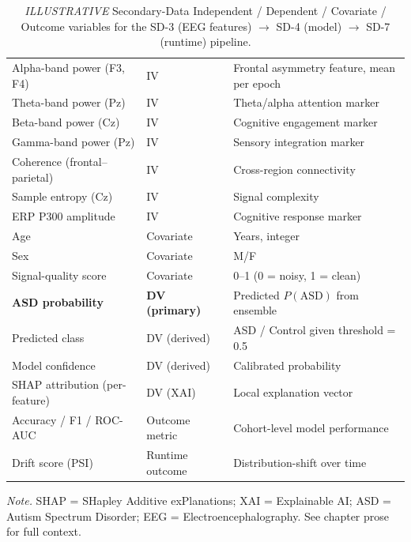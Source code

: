 {\tablestripes\tablefontsize
{}
\begin{xltabular}{\textwidth}{@{} >{\raggedright\arraybackslash}p{3.5cm} >{\centering\arraybackslash}p{1.8cm} L @{}}
\caption[ILLUSTRATIVE Secondary-Data IV/DV Map]{\emph{ILLUSTRATIVE} Secondary-Data Independent / Dependent / Covariate / Outcome variables for the SD-3 (EEG features) $\to$ SD-4 (model) $\to$ SD-7 (runtime) pipeline.}\label{tab:ch4_secondary_iv_dv} \\
\toprule
{} &  &  \\
\midrule
\endfirsthead
\endhead
\bottomrule
\endlastfoot
Alpha-band power (F3, F4) & IV & Frontal asymmetry feature, mean per epoch \\
Theta-band power (Pz) & IV & Theta/alpha attention marker \\
Beta-band power (Cz) & IV & Cognitive engagement marker \\
Gamma-band power (Pz) & IV & Sensory integration marker \\
Coherence (frontal--parietal) & IV & Cross-region connectivity \\
Sample entropy (Cz) & IV & Signal complexity \\
ERP P300 amplitude & IV & Cognitive response marker \\
Age & Covariate & Years, integer \\
Sex & Covariate & M/F \\
Signal-quality score & Covariate & 0--1 (0 = noisy, 1 = clean) \\
\textbf{ASD probability} & \textbf{DV (primary)} & Predicted $P(\text{ASD})$ from ensemble \\
Predicted class & DV (derived) & ASD / Control given threshold = 0.5 \\
Model confidence & DV (derived) & Calibrated probability \\
SHAP attribution (per-feature) & DV (XAI) & Local explanation vector \\
Accuracy / F1 / ROC-AUC & Outcome metric & Cohort-level model performance \\
Drift score (PSI) & Runtime outcome & Distribution-shift over time \\
\end{xltabular}}
\vspace{0.3em}\noindent\textit{Note.} SHAP = SHapley Additive exPlanations; XAI = Explainable AI; ASD = Autism Spectrum Disorder; EEG = Electroencephalography. See chapter prose for full context.

